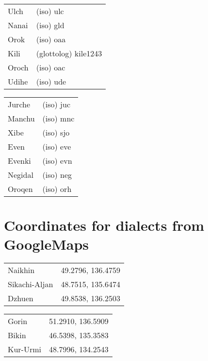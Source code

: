 \documentclass[output=paper]{langscibook}
\begin{document}
\begin{tabularx}{.45\textwidth}{lQ}
    Ulch & (iso) ulc\\
    Nanai & (iso) gld\\
    Orok & (iso) oaa\\
    Kili & (glottolog) kile1243\\
    Oroch & (iso) oac\\
    Udihe & (iso) ude\\
    \end{tabularx}
\begin{tabularx}{.45\textwidth}{lQ}
    Jurche & (iso) juc\\
    Manchu & (iso) mnc\\
    Xibe & (iso) sjo\\
    Even & (iso) eve\\
    Evenki & (iso) evn\\
    Negidal & (iso) neg\\
    Oroqen & (iso) orh\\
\end{tabularx}

\section*{Coordinates for dialects from GoogleMaps}

\begin{tabularx}{.45\textwidth}{l@{~}Q}
    Naikhin & 49.2796, 136.4759\\
    Sikachi-Aljan & 48.7515, 135.6474\\
    Dzhuen & 49.8538, 136.2503\\
\end{tabularx}
\begin{tabularx}{.45\textwidth}{l@{~}Q}
    Gorin & 51.2910, 136.5909\\
    Bikin & 46.5398, 135.3583\\
    Kur-Urmi & 48.7996, 134.2543\\
\end{tabularx}
\end{document}
